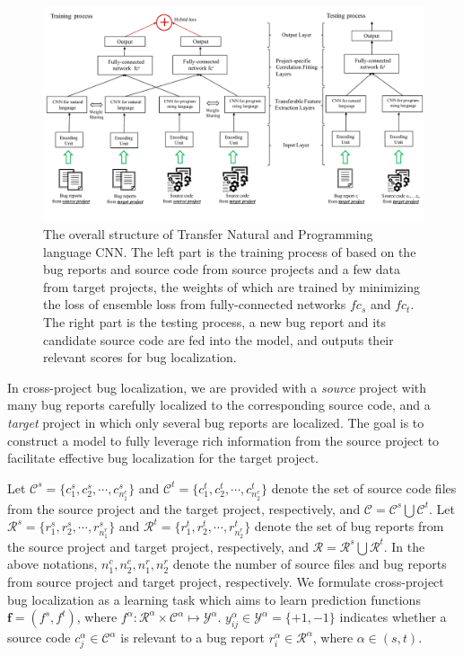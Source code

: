 \begin{figure}[hbt]
\centering
\includegraphics[width = 2\columnwidth]{pic/structure.pdf}
\caption{The overall structure of Transfer Natural and Programming language CNN.  The left part is the training process of \TRANPCNN based on the bug reports and source code from source projects and a few data from target projects, the weights of which are trained by minimizing the loss of ensemble loss from fully-connected networks $fc_s$ and $fc_t$. The right part is the testing process, a new bug report and its candidate source code are fed into the model, and \TRANPCNN outputs their relevant scores for bug localization.}
\label{fig:structure}
\end{figure}

In cross-project bug localization, we are provided with a \emph{source} project with many bug reports carefully localized to the corresponding source code, and a \emph{target} project in which only several bug reports are localized. The goal is to construct a model to fully leverage rich information from the source project to facilitate effective bug localization for the target project.

Let $\mathcal{C}^s = \{ { c^s_1, c^s_2}, \cdots, c^s_{n^c_1} \} $ and $\mathcal{C}^t =\{ c^t_1, c^t_2, \cdots, c^t_{n^c_2} \}$ denote the set of source code files from the source project and the target project, respectively, and $\mathcal{C}=\mathcal{C}^s \bigcup \mathcal{C}^t $. Let $\mathcal{R}^s =\{r^s_1, r^s_2, \cdots, r^s_{n^r_1}\}$ and $\mathcal{R}^t =\{ r^t_1, r^t_2, \cdots, r^t_{n^r_2}\}$ denote the set of bug reports from the source project and target project, respectively, and $\mathcal{R}=\mathcal{R}^s \bigcup \mathcal{R}^t $. In the above notations, $n^c_1, n^c_2, n^r_1, n^r_2$ denote the number of source files and bug reports from source project and target project, respectively. We formulate cross-project bug localization as a learning task which aims to learn prediction functions $\mathbf{f}=(f^s,f^t)$, where $f^\alpha: \mathcal{R}^\alpha \times \mathcal{C}^\alpha \mapsto \mathcal{Y}^\alpha$. $y^\alpha_{ij} \in \mathcal{Y}^\alpha = \{+1, -1\}$ indicates whether a source code $c^\alpha_j \in \mathcal{C}^\alpha $ is relevant to a bug report $r^\alpha_i \in \mathcal{R}^\alpha$, where $\alpha \in (s,t)$.


